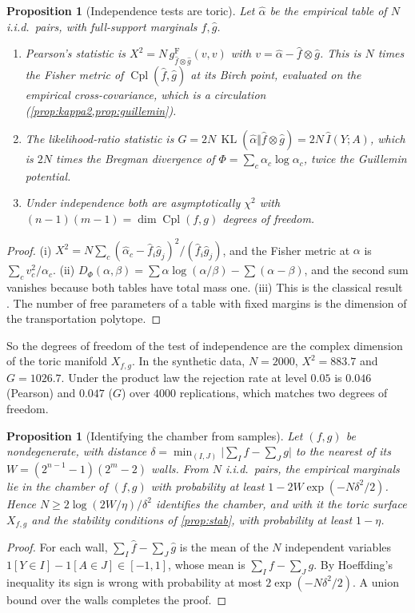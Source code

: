 \documentclass[11pt]{article}
\newtheorem{proposition}[theorem]{Proposition}
\theoremstyle{definition}
\theoremstyle{remark}
\newcommand{\Cpl}{\operatorname{Cpl}}
\begin{document}
\begin{proposition}[Independence tests are toric]\label{prop:indeptests}
Let $\hat\alpha$ be the empirical table of $N$ i.i.d.\ pairs, with full-support marginals $\hat f,\hat g$.
\begin{enumerate}[label=(\roman*)]
\item Pearson's statistic is $X^2=N\,g^{\mathrm F}_{\hat f\otimes\hat g}(v,v)$ with $v=\hat\alpha-\hat f\otimes\hat g$. This is $N$ times the Fisher
  metric of $\Cpl(\hat f,\hat g)$ at its Birch point, evaluated on the empirical cross-covariance, which is a circulation
  (\cref{prop:kappa2,prop:guillemin}).
\item The likelihood-ratio statistic is $G=2N\,\operatorname{KL}(\hat\alpha\Vert\hat f\otimes\hat g)=2N\,\hat I(Y;A)$, which is $2N$ times the
  Bregman divergence of $\Phi=\sum_c\alpha_c\log\alpha_c$, twice the Guillemin potential.
\item Under independence both are asymptotically $\chi^2$ with $(n-1)(m-1)=\dim\Cpl(f,g)$ degrees of freedom.
\end{enumerate}
\end{proposition}
\begin{proof}
(i) $X^2=N\sum_c(\hat\alpha_c-\hat f_i\hat g_j)^2/(\hat f_i\hat g_j)$, and the Fisher metric at $\alpha$ is $\sum_cv_c^2/\alpha_c$.
(ii) $D_\Phi(\alpha,\beta)=\sum\alpha\log(\alpha/\beta)-\sum(\alpha-\beta)$, and the second sum vanishes because both tables have total
mass one. (iii) This is the classical result \cite{Agresti2013}. The number of free parameters of a table with fixed
margins is the dimension of the transportation polytope.
\end{proof}

So the degrees of freedom of the test of independence are the complex dimension of the toric manifold $X_{f,g}$. In the
synthetic data, $N=2000$, $X^2=883.7$ and $G=1026.7$. Under the product law the rejection rate at level $0.05$ is $0.046$
(Pearson) and $0.047$ ($G$) over $4000$ replications, which matches two degrees of freedom.

\begin{proposition}[Identifying the chamber from samples]\label{prop:chamberid}
Let $(f,g)$ be nondegenerate, with distance $\delta=\min_{(I,J)}\lvert\sum_If-\sum_Jg\rvert$ to the nearest of its
$W=(2^{n-1}-1)(2^m-2)$ walls. From $N$ i.i.d.\ pairs, the empirical marginals lie in the chamber of $(f,g)$ with probability
at least $1-2W\exp(-N\delta^2/2)$. Hence $N\ge2\log(2W/\eta)/\delta^2$ identifies the chamber, and with it the toric
surface $X_{f,g}$ and the stability conditions of \cref{prop:stab}, with probability at least $1-\eta$.
\end{proposition}
\begin{proof}
For each wall, $\sum_I\hat f-\sum_J\hat g$ is the mean of the $N$ independent variables $1[Y\in I]-1[A\in J]\in[-1,1]$, whose
mean is $\sum_If-\sum_Jg$. By Hoeffding's inequality its sign is wrong with probability at most $2\exp(-N\delta^2/2)$. A union
bound over the walls completes the proof.
\end{proof}
\end{document}
